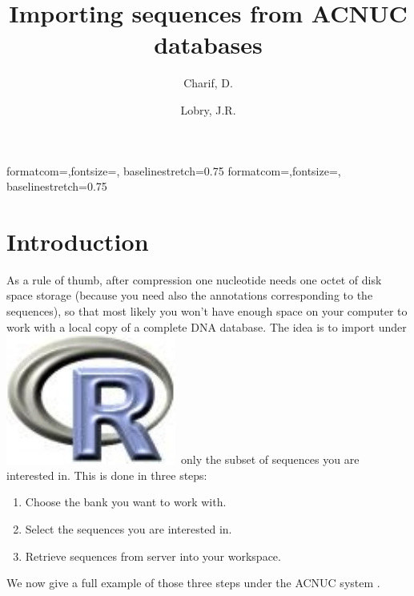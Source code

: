\documentclass{article}
\title{Importing sequences from ACNUC databases}
\author{Charif, D. \and Lobry, J.R.}
\begin{document}

%
%
{formatcom={\color{Sinput}},fontsize=\footnotesize, baselinestretch=0.75}
{formatcom={\color{Soutput}},fontsize=\footnotesize, baselinestretch=0.75}
%
%
\renewenvironment{Schunk}{\vspace{\topsep}}{\vspace{\topsep}}
%
%
\newcommand{\Rlogo}{\protect\includegraphics[height=1.8ex,keepaspectratio]{../figs/Rlogo.pdf}}
%
%
\newcommand{\seqinr}{\texttt{seqin\bf{R}}}
\newcommand{\Seqinr}{\texttt{Seqin\bf{R}}}
%
%
%
%
%


\maketitle
\tableofcontents

\section*{Introduction}

As a rule of thumb, after compression one nucleotide needs one octet
of disk space storage (because you need also the annotations corresponding
to the sequences), so that most likely you won't have enough space on
your computer to work with a local copy of a complete DNA database.
The idea is to import under \Rlogo{}~only the subset of sequences you are
interested in. This is done in three steps:
\begin{enumerate}
\item Choose the bank you want to work with.
\item Select the sequences you are interested in.
\item Retrieve sequences from server into your workspace.
\end{enumerate}
We now give a full example of those three steps under the ACNUC system
\cite{GautierC1982a, GautierC1982b, acnuc1984, acnuc1985, acnuc1985b}.
\end{document}
